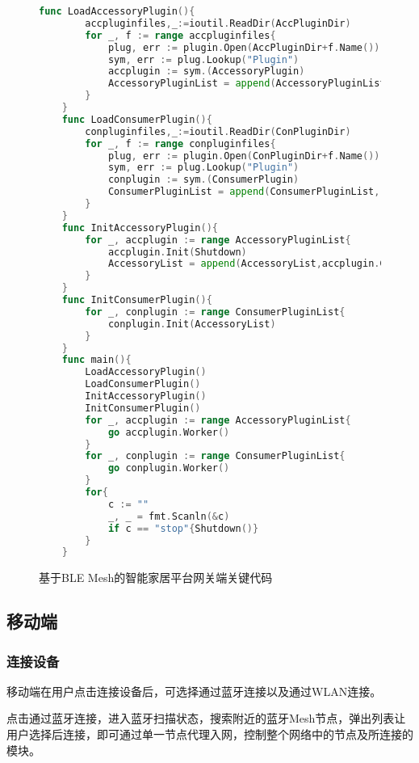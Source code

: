 \begin{figure}[H]
    \centering
    \begin{lstlisting}[language=Go]
    func LoadAccessoryPlugin(){
        accpluginfiles,_:=ioutil.ReadDir(AccPluginDir)
        for _, f := range accpluginfiles{
            plug, err := plugin.Open(AccPluginDir+f.Name())
            sym, err := plug.Lookup("Plugin")
            accplugin := sym.(AccessoryPlugin)
            AccessoryPluginList = append(AccessoryPluginList, accplugin)
        }
    }
    func LoadConsumerPlugin(){
        conpluginfiles,_:=ioutil.ReadDir(ConPluginDir)
        for _, f := range conpluginfiles{
            plug, err := plugin.Open(ConPluginDir+f.Name())
            sym, err := plug.Lookup("Plugin")
            conplugin := sym.(ConsumerPlugin)
            ConsumerPluginList = append(ConsumerPluginList, conplugin)
        }
    }
    func InitAccessoryPlugin(){
        for _, accplugin := range AccessoryPluginList{
            accplugin.Init(Shutdown)
            AccessoryList = append(AccessoryList,accplugin.GetAccessoryList()...)
        }
    }
    func InitConsumerPlugin(){
	    for _, conplugin := range ConsumerPluginList{
	    	conplugin.Init(AccessoryList)
	    }
    }
    func main(){
        LoadAccessoryPlugin()
        LoadConsumerPlugin()
        InitAccessoryPlugin()
        InitConsumerPlugin()
        for _, accplugin := range AccessoryPluginList{
            go accplugin.Worker()
        }
        for _, conplugin := range ConsumerPluginList{
            go conplugin.Worker()
        }
        for{
            c := ""
            _, _ = fmt.Scanln(&c)
            if c == "stop"{Shutdown()}
        }
    }
    \end{lstlisting}
    \caption{基于BLE Mesh的智能家居平台网关端关键代码}
    \label{fig:code_gateway}
\end{figure}

\subsection{移动端}

\subsubsection{连接设备}
移动端在用户点击连接设备后，可选择通过蓝牙连接以及通过WLAN连接。

点击通过蓝牙连接，进入蓝牙扫描状态，搜索附近的蓝牙Mesh节点，弹出列表让用户选择后连接，即可通过单一节点代理入网，控制整个网络中的节点及所连接的模块。

